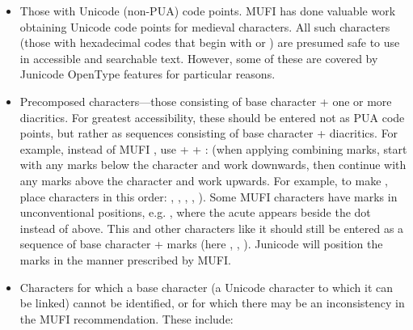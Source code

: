 \liststyleLi
\begin{itemize}
\item Those with Unicode (non-PUA) code points. MUFI has done valuable work obtaining Unicode code points for medieval characters.
All such characters (those with hexadecimal codes that  begin with 
or ) are presumed safe to use in accessible and searchable text. However, some of these are
covered by Junicode OpenType features for particular reasons.
\item Precomposed characters---those consisting of base character + one or more diacritics. For greatest accessibility,
these should be entered not as PUA code points, but rather as sequences consisting of base character +
diacritics. For example, instead of MUFI  , use
 +   +  :
 (when applying combining marks, start with any marks below the character and work
downwards, then continue with any marks above the character and work upwards. For example, to make
, place characters in this order: ,
 ,  ,  ,  ). Some MUFI characters have marks in unconventional positions,
e.g.  , where the
acute appears beside the dot instead of above. This and other characters like it should still be entered as a sequence
of base character + marks (here ,  ,
 ). Junicode will position the marks in the manner prescribed by MUFI.
\item Characters for which a base character (a Unicode character to which it can be linked) cannot be identified, or for
which there may be an inconsistency in the MUFI recommendation. These include:


\end{itemize}
